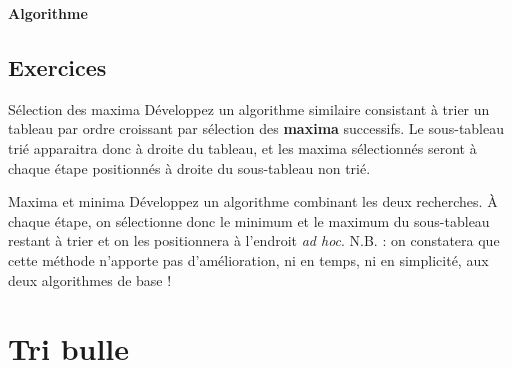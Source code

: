 	{\sffamily\bfseries\upshape
	Algorithme}
	

	\bigskip


	\subsection*{Exercices}

	\begin{Exercice}{Sélection des maxima}
		Développez un algorithme similaire consistant à trier un tableau par
		ordre croissant par sélection des \textbf{maxima} successifs. Le
		sous-tableau trié apparaitra donc à droite du tableau, et les maxima
		sélectionnés seront à chaque étape positionnés à droite du sous-tableau
		non trié. 
	\end{Exercice}
	
	\begin{Exercice}{Maxima et minima}
		Développez un algorithme combinant les deux recherches. À chaque étape,
		on sélectionne donc le minimum et le maximum du sous-tableau restant à
		trier et on les positionnera à l’endroit \textit{ad hoc}. N.B. : on
		constatera que cette méthode n’apporte pas d’amélioration, ni en temps,
		ni en simplicité, aux deux algorithmes de base !
	\end{Exercice}
	

\section{Tri bulle}
	
